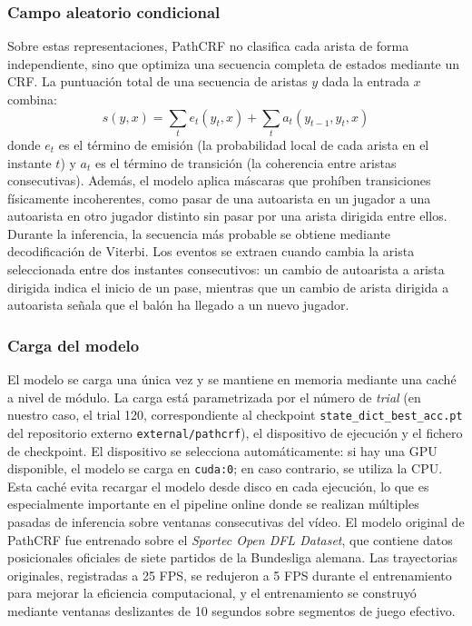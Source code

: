 \subsubsection{Campo aleatorio condicional}
Sobre estas representaciones, PathCRF no clasifica cada arista de forma independiente, sino que optimiza una secuencia completa de estados mediante un CRF. La puntuación total de una secuencia de aristas $y$ dada la entrada $x$ combina:
\[
s(y,x)=\sum_t e_t(y_t,x) + \sum_t a_t(y_{t-1},y_t,x)
\]
donde $e_t$ es el término de emisión (la probabilidad local de cada arista en el instante $t$) y $a_t$ es el término de transición (la coherencia entre aristas consecutivas). Además, el modelo aplica máscaras que prohíben transiciones físicamente incoherentes, como pasar de una autoarista en un jugador a una autoarista en otro jugador distinto sin pasar por una arista dirigida entre ellos.
Durante la inferencia, la secuencia más probable se obtiene mediante decodificación de Viterbi. Los eventos se extraen cuando cambia la arista seleccionada entre dos instantes consecutivos: un cambio de autoarista a arista dirigida indica el inicio de un pase, mientras que un cambio de arista dirigida a autoarista señala que el balón ha llegado a un nuevo jugador.
\subsubsection{Carga del modelo}
El modelo se carga una única vez y se mantiene en memoria mediante una caché a nivel de módulo. La carga está parametrizada por el número de \textit{trial} (en nuestro caso, el trial 120, correspondiente al checkpoint \texttt{state\_dict\_best\_acc.pt} del repositorio externo \texttt{external/pathcrf}), el dispositivo de ejecución y el fichero de checkpoint. El dispositivo se selecciona automáticamente: si hay una GPU disponible, el modelo se carga en \texttt{cuda:0}; en caso contrario, se utiliza la CPU. Esta caché evita recargar el modelo desde disco en cada ejecución, lo que es especialmente importante en el pipeline online donde se realizan múltiples pasadas de inferencia sobre ventanas consecutivas del vídeo.
El modelo original de PathCRF fue entrenado sobre el \textit{Sportec Open DFL Dataset}, que contiene datos posicionales oficiales de siete partidos de la Bundesliga alemana. Las trayectorias originales, registradas a 25 FPS, se redujeron a 5 FPS durante el entrenamiento para mejorar la eficiencia computacional, y el entrenamiento se construyó mediante ventanas deslizantes de 10 segundos sobre segmentos de juego efectivo.
